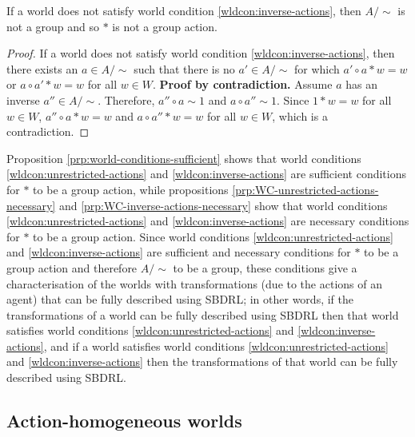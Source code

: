 	\begin{proposition}\label{prp:WC-inverse-actions-necessary}
		If a world does not satisfy world condition \ref{wldcon:inverse-actions}, then $A/\sim$ is not a group and so $*$ is not a group action.
	\end{proposition}
	\begin{proof}
		If a world does not satisfy world condition \ref{wldcon:inverse-actions}, then there exists an $a \in A/\sim$ such that there is no $a' \in A/\sim$ for which $a' \circ a * w = w$ or $a \circ a' * w = w$ for all $w \in W$.
		\textbf{Proof by contradiction.}
		Assume $a$ has an inverse $a'' \in A/\sim$.
		Therefore, $a'' \circ a \sim 1$ and $a \circ a'' \sim 1$.
		Since $1 * w = w$ for all $w \in W$, $a'' \circ a * w = w$ and $a \circ a'' * w = w$ for all $w \in W$, which is a contradiction.
	\end{proof}


	Proposition \ref{prp:world-conditions-sufficient} shows that world conditions \ref{wldcon:unrestricted-actions} and \ref{wldcon:inverse-actions} are sufficient conditions for $*$ to be a group action, while propositions \ref{prp:WC-unrestricted-actions-necessary} and \ref{prp:WC-inverse-actions-necessary} show that world conditions \ref{wldcon:unrestricted-actions} and \ref{wldcon:inverse-actions} are necessary conditions for $*$ to be a group action.
	Since world conditions \ref{wldcon:unrestricted-actions} and \ref{wldcon:inverse-actions} are sufficient and necessary conditions for $*$ to be a group action and therefore $A/\sim$ to be a group, these conditions give a characterisation of the worlds with transformations (due to the actions of an agent) that can be fully described using SBDRL; in other words, if the transformations of a world can be fully described using SBDRL then that world satisfies world conditions \ref{wldcon:unrestricted-actions} and \ref{wldcon:inverse-actions}, and if a world satisfies world conditions \ref{wldcon:unrestricted-actions} and \ref{wldcon:inverse-actions} then the transformations of that world can be fully described using SBDRL.

\subsection{Action-homogeneous worlds}


